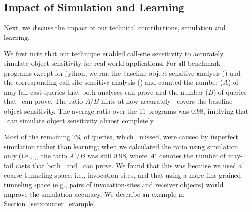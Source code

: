 

\subsection{Impact of Simulation and Learning}\label{sec:eval_learning}


Next, we discuss the impact of our technical contributions, simulation and learning. 

We first note that our technique enabled call-site
sensitivity to accurately simulate object sensitivity for real-world
applications.
For all benchmark programs except for jython, we ran the
baseline object-sensitive analysis (\oneobjHT) and the corresponding
call-site sensitive analysis (\ours) and counted the number ($A$) of may-fail cast
queries that both analyses can prove and the number ($B$) of queries
that \oneobjHT~can prove. The ratio $A/B$ hints at how accurately
\ours~covers the baseline object sensitivity. The
average ratio over the 11 programs was $0.98$, implying that \ourtechnique~can simulate object sensitivity almost completely.

Most of the remaining 2\% of queries, which \ourtechnique~missed, were caused by imperfect simulation rather than learning; 
when we calculated the ratio using simulation only (i.e., \oursim), 
the ratio $A'/B$ was still $0.98$, where $A'$ denotes the number of may-fail casts that both \oursim~and \oneobjHT~can prove. 
We found that this was because we used a coarse tunneling space, i.e., invocation sites, and that 
using a more fine-grained tunneling space (e.g., pairs of invocation-sites and receiver objects) would improve the simulation accuracy. 
We describe an example in Section~\ref{sec:counter_example}. 



